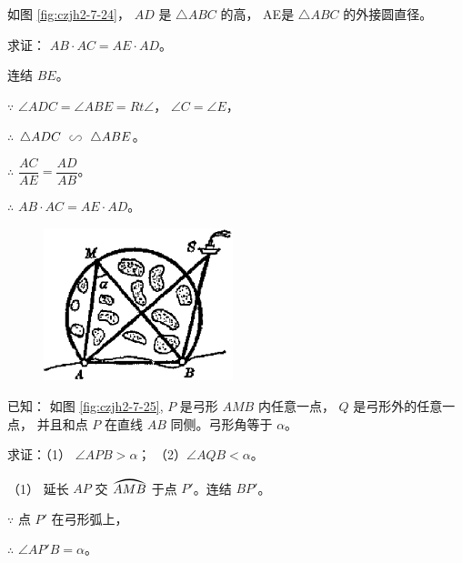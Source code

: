 \begin{enhancedline}
\liti 如图 \ref{fig:czjh2-7-24}， $AD$ 是 $\triangle ABC$ 的高， AE是 $\triangle ABC$  的外接圆直径。

求证： $AB \cdot AC = AE \cdot AD$。

\zhengming 连结 $BE$。

$\because$ \quad $\angle ADC = \angle ABE = Rt \angle$， $\angle C = \angle E$，

$\therefore$ \quad $\triangle ADC \xiangsi \triangle ABE$。

$\therefore$ \quad $\dfrac{AC}{AE} = \dfrac{AD}{AB}$。

$\therefore$ \quad $AB \cdot AC = AE \cdot AD$。


\begin{figure}[htbp]
    \centering
    \begin{minipage}[b]{4.5cm}
        \centering
        
        \caption{}\label{fig:czjh2-7-24}
    \end{minipage}
    \qquad
    \begin{minipage}[b]{4.5cm}
        \centering
        
        \caption{}\label{fig:czjh2-7-25}
    \end{minipage}
    \qquad
    \begin{minipage}[b]{6cm}
        \centering
        \includegraphics[width=5.5cm]{../pic/czjh2-ch7-26.png}
        \caption{}\label{fig:czjh2-7-26}
    \end{minipage}
\end{figure}


\liti 已知： 如图 \ref{fig:czjh2-7-25}, $P$ 是弓形 $AMB$ 内任意一点， $Q$ 是弓形外的任意一点，
并且和点 $P$ 在直线 $AB$ 同侧。弓形角等于 $\alpha$。

求证：（1） $\angle APB > \alpha$； （2）$\angle AQB < \alpha$。

\zhengming （1） 延长 $AP$ 交 $\yuanhu{AMB}$ 于点 $P'$。连结 $BP'$。

$\because$ \quad 点 $P'$ 在弓形弧上，

$\therefore$ \quad $\angle AP'B = \alpha$。


\end{enhancedline}
